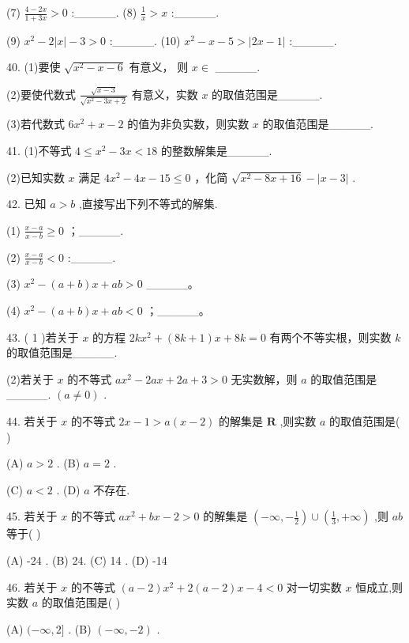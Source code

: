 \documentclass[10pt]{article}
\begin{document}
(7) \(\frac{4 - {2x}}{1 + {3x}} > 0\) :\_\_\_\_\_. (8) \(\frac{1}{x} > x\) :\_\_\_\_\_.

(9) \({x}^{2} - 2\left| x\right|  - 3 > 0\) :\_\_\_\_\_. (10) \({x}^{2} - x - 5 > \left| {{2x} - 1}\right|\) :\_\_\_\_\_.

40. (1)要使 \(\sqrt{{x}^{2} - x - 6}\) 有意义， 则 \(x \in\) \_\_\_\_\_.

(2)要使代数式 \(\frac{\sqrt{x - 3}}{\sqrt{{x}^{2} - {3x} + 2}}\) 有意义，实数 \(x\) 的取值范围是\_\_\_\_\_.

(3)若代数式 \(6{x}^{2} + x - 2\) 的值为非负实数，则实数 \(x\) 的取值范围是\_\_\_\_\_.

41. (1)不等式 \(4 \leq  {x}^{2} - {3x} < {18}\) 的整数解集是\_\_\_\_\_.

(2)已知实数 \(x\) 满足 \(4{x}^{2} - {4x} - {15} \leq  0\) ，化简 \(\sqrt{{x}^{2} - {8x} + {16}} - \left| {x - 3}\right|\) .

42. 已知 \(a > b\) ,直接写出下列不等式的解集.

(1) \(\frac{x - a}{x - b} \geq  0\) ；\_\_\_\_\_.

(2) \(\frac{x - a}{x - b} < 0\) :\_\_\_\_\_.

(3) \({x}^{2} - \left( {a + b}\right) x + {ab} > 0\) \_\_\_\_\_。

(4) \({x}^{2} - \left( {a + b}\right) x + {ab} < 0\) ；\_\_\_\_\_。

43. ( 1 )若关于 \(x\) 的方程 \({2k}{x}^{2} + \left( {{8k} + 1}\right) x + {8k} = 0\) 有两个不等实根，则实数 \(k\) 的取值范围是\_\_\_\_\_.

(2)若关于 \(x\) 的不等式 \(a{x}^{2} - {2ax} + {2a} + 3 > 0\) 无实数解，则 \(a\) 的取值范围是\_\_\_\_\_. \(\left( {a \neq  0}\right)\) .

44. 若关于 \(x\) 的不等式 \({2x} - 1 > a\left( {x - 2}\right)\) 的解集是 \(\mathbf{R}\) ,则实数 \(a\) 的取值范围是(   )

(A) \(a > 2\) . (B) \(a = 2\) .

(C) \(a < 2\) . (D) \(a\) 不存在.

45. 若关于 \(x\) 的不等式 \(a{x}^{2} + {bx} - 2 > 0\) 的解集是 \(\left( {-\infty , - \frac{1}{2}}\right)  \cup  \left( {\frac{1}{3}, + \infty }\right)\) ,则 \({ab}\) 等于( )

(A) -24 . (B) 24. (C) 14 . (D) -14

46. 若关于 \(x\) 的不等式 \(\left( {a - 2}\right) {x}^{2} + 2\left( {a - 2}\right) x - 4 < 0\) 对一切实数 \(x\) 恒成立,则实数 \(a\) 的取值范围是( )

(A) \(( - \infty ,2\rbrack\) . (B) \(\left( {-\infty , - 2}\right)\) .
\end{document}
